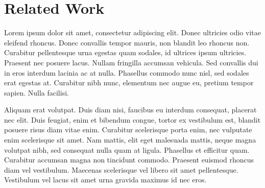 
\section{Related Work} \label{sec:relatedwork}


Lorem ipsum dolor sit amet, consectetur adipiscing elit. Donec ultricies odio vitae eleifend rhoncus. Donec convallis tempor mauris, non blandit leo rhoncus non. Curabitur pellentesque urna egestas quam sodales, id ultrices ipsum ultricies. Praesent nec posuere lacus. Nullam fringilla accumsan vehicula. Sed convallis dui in eros interdum lacinia ac at nulla. Phasellus commodo nunc nisl, sed sodales erat egestas at. Curabitur nibh nunc, elementum nec augue eu, pretium tempor sapien. Nulla facilisi.

Aliquam erat volutpat. Duis diam nisi, faucibus eu interdum consequat, placerat nec elit. Duis feugiat, enim et bibendum congue, tortor ex vestibulum est, blandit posuere risus diam vitae enim. Curabitur scelerisque porta enim, nec vulputate enim scelerisque sit amet. Nam mattis, elit eget malesuada mattis, neque magna volutpat nibh, sed consequat nulla quam at ligula. Phasellus et efficitur quam. Curabitur accumsan magna non tincidunt commodo. Praesent euismod rhoncus diam vel vestibulum. Maecenas scelerisque vel libero sit amet pellentesque. Vestibulum vel lacus sit amet urna gravida maximus id nec eros.